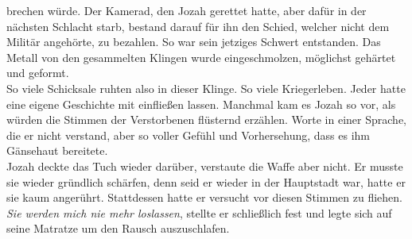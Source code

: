 brechen würde. Der Kamerad, den Jozah gerettet hatte, aber dafür in der nächsten Schlacht starb, 
bestand darauf für ihn den Schied, welcher nicht dem Militär angehörte, zu bezahlen. So war sein 
jetziges Schwert entstanden. Das Metall von den gesammelten Klingen wurde eingeschmolzen, möglichst 
gehärtet und geformt. \\
So viele Schicksale ruhten also in dieser Klinge. So viele Kriegerleben. Jeder hatte eine eigene 
Geschichte mit einfließen lassen. Manchmal kam es Jozah so vor, als würden die Stimmen der 
Verstorbenen flüsternd erzählen. Worte in einer Sprache, die er nicht verstand, aber so voller 
Gefühl und Vorhersehung, dass es ihm Gänsehaut bereitete.\\
Jozah deckte das Tuch wieder darüber, verstaute die Waffe aber nicht. Er musste sie wieder 
gründlich schärfen, denn seid er wieder in der Hauptstadt war, hatte er sie kaum angerührt. 
Stattdessen hatte er versucht vor diesen Stimmen zu fliehen. \textit{Sie werden mich nie mehr 
loslassen}, stellte er schließlich fest und legte sich auf seine Matratze um den Rausch 
auszuschlafen.\\

